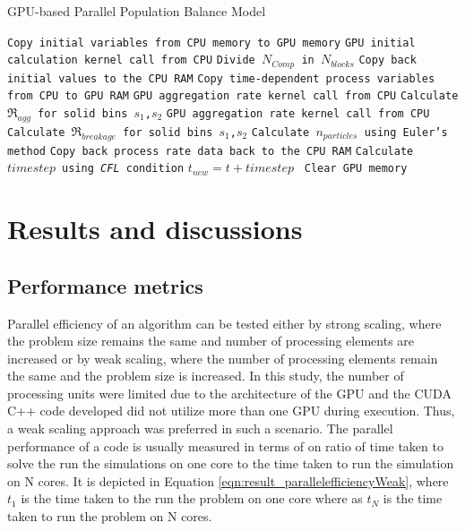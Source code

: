 \documentclass[preprint,10pt,authoryear,review]{elsarticle}
\begin{document}
\begin{algorithm}
     \scriptsize
     \caption{GPU-based Parallel Population Balance Model}
     \label{alg:GPUparallelPBM}
     \begin{algorithmic}[1]
     \State\texttt{Copy initial variables from CPU memory to GPU memory}
     \State \texttt{GPU initial calculation kernel call from CPU}
     \State \texttt{Divide $N_{Comp}$ in $N_{blocks}$}
     \State \texttt{Copy back initial values to the CPU RAM}
	 \State \texttt{Copy time-dependent process variables from CPU to GPU RAM}
     \State \texttt{GPU aggregation rate kernel call from CPU}
     \State \texttt{Calculate $\Re_{agg}$ for solid bins $s_1$,$s_2$}
	 \State \texttt{GPU aggregation rate kernel call from CPU}     
     \State \texttt{Calculate $\Re_{breakage}$ for solid bins $s_1$,$s_2$}
     \State \texttt{Calculate $n_{particles}$ using Euler's method}
     \State \texttt{Copy back process rate data back to the CPU RAM}
     \State \texttt{Calculate $timestep$ using \textit{CFL} condition}
     \State \texttt{$t_{new} = t + timestep$ }
     \EndWhile
     \State \texttt{Clear GPU memory}
     \EndProcedure
     \end{algorithmic}
 \end{algorithm}

\section{Results and discussions}
\label{secResults}
 \subsection{Performance metrics}
Parallel efficiency of an algorithm can be tested either by strong scaling, 
where the problem size remains the same and number of processing elements 
are increased or by weak scaling, where the number of processing elements 
remain the same and the problem size is increased. In this study, the 
number of processing units were limited due to the architecture of the 
GPU and the CUDA C++ code developed did not utilize more than one GPU 
during execution. Thus, a weak scaling approach was preferred in such a 
scenario. The parallel performance of a code is usually measured in 
terms of on ratio of time taken to solve the run the simulations on one 
core to the time taken to run the simulation on N cores. It is depicted in
Equation \ref{eqn:result_parallelefficiencyWeak}, where $t_1$ is the time taken 
to the run the problem on one core where as $t_N$ is the time taken to 
run the problem on N cores.
\end{document}
